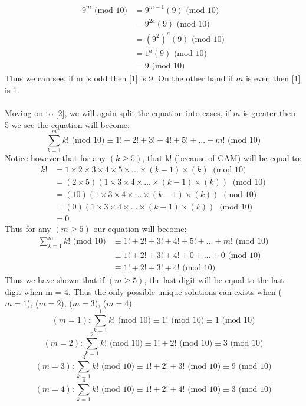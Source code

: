 \documentclass[11pt]{article}
\begin{document}
\begin{align*}
9^m \text{ (mod 10)} & = 9^{m-1}(9) \text{ (mod 10)}\\
& = 9^{2a}(9) \text{ (mod 10)}\\
& = (9^2)^a(9) \text{ (mod 10)}\\
& =1^a(9) \text{ (mod 10)}\\
& = 9 \text{ (mod 10)}
\end{align*}
Thus we can see, if m is odd then [1] is 9. On the other hand if $m$ is even then [1] is 1.\\\\
Moving on to [2], we will again split the equation into cases, if $m$ is greater then 5 we see the equation will become:
\[ \sum\limits_{k = 1}^m k! \text{ (mod 10)} \equiv 1! + 2! + 3! + 4! +5!+ ...+  m! \text{ (mod 10)}\]
Notice however that for any $(k \geq 5)$, that k! (because of CAM) will be equal to:
\begin{align*}
k! & = 1 \times 2 \times 3 \times 4 \times 5 \times  ... \times  (k-1) \times (k) \ \text{ (mod 10)}\\
 & = (2 \times 5)(1 \times 3 \times 4 \times  ... \times  (k-1) \times (k)) \ \text{ (mod 10)}\\
& =(10)(1 \times 3 \times 4 \times  ... \times  (k-1) \times (k)) \ \text{ (mod 10)}\\
& =(0)(1 \times 3 \times 4 \times  ... \times  (k-1) \times (k)) \ \text{ (mod 10)}\\
& =0
\end{align*}
Thus for any $(m \geq 5)$ our equation will become:
\begin{align*}
\sum\limits_{k = 1}^m k! \text{ (mod 10)} & \equiv 1! + 2! + 3! + 4! +5!+ ...+  m! \text{ (mod 10)}\\
 & \equiv 1! + 2! + 3! + 4! + 0+ ...+  0 \text{ (mod 10)}\\
& \equiv 1! + 2! +3! +4! \text{ (mod 10)}
\end{align*}
Thus we have shown that if  $(m \geq 5)$, the last digit will be equal to the last digit when m = 4. Thus the only possible unique solutions can exists when ($m = 1$), ($m = 2$), ($m = 3$), ($m = 4$):
\[ (m = 1): \sum\limits_{k = 1}^1 k! \text{ (mod 10)} \equiv 1! \text{ (mod 10)} \equiv 1 \text{ (mod 10)}\]
\[ (m = 2): \sum\limits_{k = 1}^2 k! \text{ (mod 10)} \equiv 1! + 2! \text{ (mod 10)} \equiv  3 \text{ (mod 10)}\]
\[ (m = 3): \sum\limits_{k = 1}^3 k! \text{ (mod 10)} \equiv 1! + 2! + 3! \text{ (mod 10)} \equiv 9 \text{ (mod 10)}\]
\[ (m = 4): \sum\limits_{k = 1}^4 k! \text{ (mod 10)} \equiv 1! + 2! + 4! \text{ (mod 10)} \equiv 3 \text{ (mod 10)} \]
\end{document}
